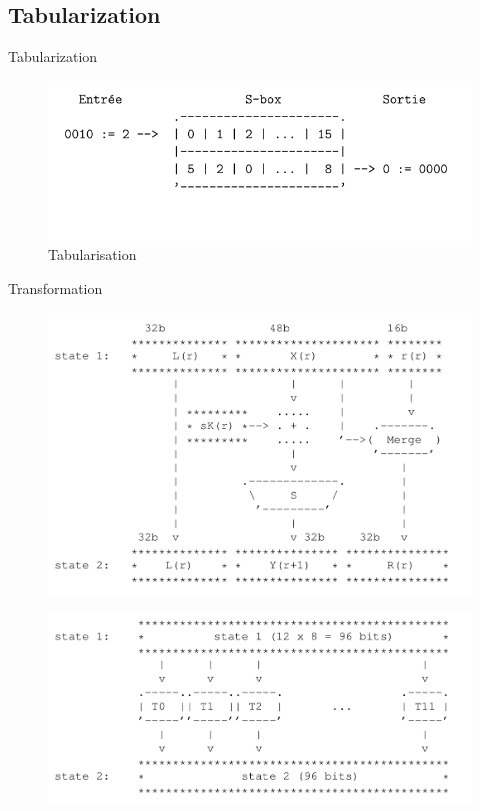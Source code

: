 \documentclass{beamer}
\begin{document}
\subsection{Tabularization}

\begin{frame}[fragile]{Tabularization}
  \begin{figure}[h]
    \centering
    \includegraphics[scale=0.60]{images/tabu.png}
    \caption{Tabularisation}
    \label{fig:keygen}
  \end{figure}
\end{frame}

\begin{frame}{Transformation}
  \begin{figure}[h]
    \centering
    \includegraphics[scale=0.20]{images/etape_1_avant.png}

  \end{figure}

  \begin{figure}[h]
    \centering
    \includegraphics[scale=0.20]{images/etape_1_apres.png}
  \end{figure}
\end{frame}
\end{document}
